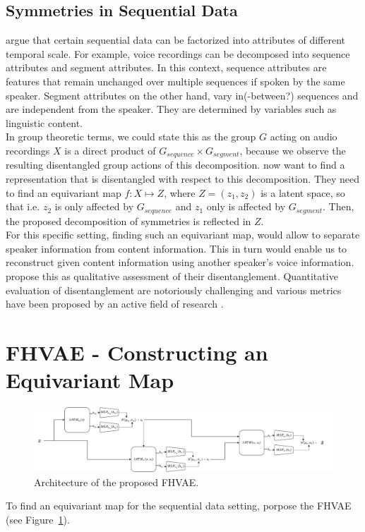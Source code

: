 \documentclass{article} %
\begin{document}
\subsection*{Symmetries in Sequential Data}
\citet{hsu2017unsupervised} argue that certain sequential data can be factorized into attributes of different temporal scale. For example, voice recordings can be decomposed into sequence attributes and segment attributes. In this context, sequence attributes are features that remain unchanged over multiple sequences if spoken by the same speaker. Segment attributes on the other hand, vary in(-between?) sequences and are independent from the speaker. They are determined by variables such as linguistic content.\\
In group theoretic terms, we could state this as the group $G$ acting on audio recordings $X$ is a direct product of $G_{sequence} \times G_{segment}$, because we observe the resulting disentangled group actions of this decomposition. \citet{hsu2017unsupervised} now want to find a representation that is disentangled with respect to this decomposition. They need to find an equivariant map $f:X\mapsto Z$, where $Z = (z_1, z_2)$ is a latent space, so that i.e. $z_2$ is only affected by $G_{sequence}$ and $z_1$ only is affected by $G_{segment}$. Then, the proposed decomposition of symmetries is reflected in $Z$.\\
For this specific setting, finding such an equivariant map, would allow to separate speaker information from content information. This in turn would enable us to reconstruct given content information using another speaker's voice information. \citet{hsu2017unsupervised} propose this as qualitative assessment of their disentanglement. Quantitative evaluation of disentanglement are notoriously challenging and various metrics have been proposed by an active field of research \cite{locatello2019challenging, higgins2016beta}.



\section*{FHVAE - Constructing an Equivariant Map}
\begin{figure}
	\label{fig:fhave}
	\centering
	\includegraphics[width=1\linewidth]{../figures/fhvae_complete.pdf}
	\caption{Architecture of the proposed FHVAE.}
\end{figure} 
To find an equivariant map for the sequential data setting, \citet{hsu2017unsupervised} porpose the FHVAE (see Figure~\ref{fig:fhave}). 
\end{document}
